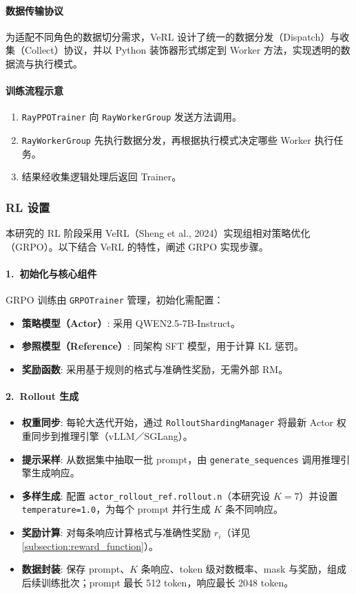 \documentclass{pkuthesis}
\begin{document}
\paragraph{数据传输协议}
为适配不同角色的数据切分需求，VeRL 设计了统一的数据分发（Dispatch）与收集（Collect）协议，并以 Python 装饰器形式绑定到 Worker 方法，实现透明的数据流与执行模式。

\paragraph{训练流程示意}
\begin{enumerate}
    \item \texttt{RayPPOTrainer} 向 \texttt{RayWorkerGroup} 发送方法调用。
    \item \texttt{RayWorkerGroup} 先执行数据分发，再根据执行模式决定哪些 Worker 执行任务。
    \item 结果经收集逻辑处理后返回 Trainer。
\end{enumerate}

\subsubsection{RL 设置}
本研究的 RL 阶段采用 VeRL（Sheng et al., 2024）实现组相对策略优化（GRPO）。以下结合 VeRL 的特性，阐述 GRPO 实现步骤。

\paragraph{1.\ 初始化与核心组件}
GRPO 训练由 \texttt{GRPOTrainer} 管理，初始化需配置：
\begin{itemize}
    \item \textbf{策略模型（Actor）}: 采用 QWEN2.5‐7B‐Instruct。
    \item \textbf{参照模型（Reference）}: 同架构 SFT 模型，用于计算 KL 惩罚。
    \item \textbf{奖励函数}: 采用基于规则的格式与准确性奖励，无需外部 RM。
\end{itemize}

\paragraph{2.\ Rollout 生成}
\begin{itemize}
    \item \textbf{权重同步}: 每轮大迭代开始，通过 \texttt{RolloutShardingManager} 将最新 Actor 权重同步到推理引擎（vLLM／SGLang）。
    \item \textbf{提示采样}: 从数据集中抽取一批 prompt，由 \texttt{generate\_sequences} 调用推理引擎生成响应。
    \item \textbf{多样生成}: 配置 \texttt{actor\_rollout\_ref.rollout.n}（本研究设 $K{=}7$）并设置 \texttt{temperature=1.0}，为每个 prompt 并行生成 $K$ 条不同响应。
    \item \textbf{奖励计算}: 对每条响应计算格式与准确性奖励 $r_i$（详见 \ref{subsection:reward_function}）。
    \item \textbf{数据封装}: 保存 prompt、$K$ 条响应、token 级对数概率、mask 与奖励，组成后续训练批次；prompt 最长 512 token，响应最长 2048 token。
\end{itemize}
\end{document}

